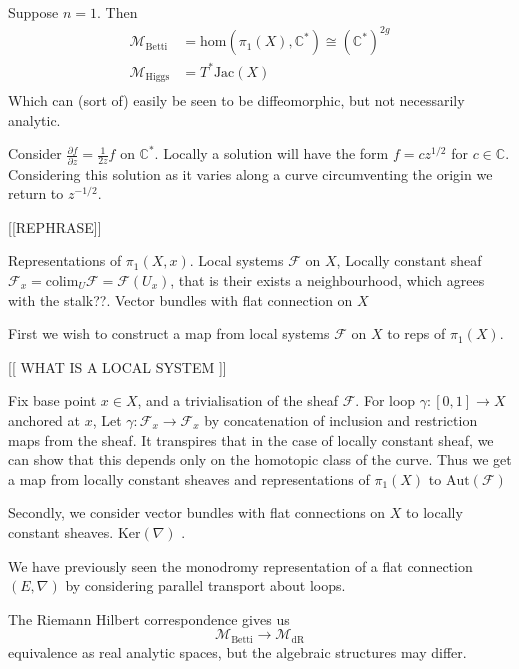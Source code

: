 Suppose $n=1$. 
Then 
\begin{align}
    \mathcal{M}_{\mathrm{Betti}} & = \mathrm{hom} ( \pi_1 (X) , \mathbb{C} ^* ) \cong (\mathbb{C} ^*)^{2g} \\
    \mathcal{M}_{\mathrm{Higgs}} & = T^* \mathrm{Jac} ( X) \\
\end{align}
Which can (sort of) easily be seen to be diffeomorphic, but not necessarily analytic. 

Consider $ \frac{\partial f }{ \partial z } = \frac{1}{2z} f $ on $ \mathbb{C} ^* $.
Locally a solution will have the form $ f = c z^{1/2} $ for $c \in \mathbb{C} $. 
Considering this solution as it varies along a curve circumventing the origin we return to $z ^{-1/2} $.

[[REPHRASE]] 

Representations of $\pi_1 (X,x) $. 
Local systems $\mathcal{F} $ on $X$,
Locally constant sheaf $ \mathcal{F}_x  = \mathrm{colim} _{U} \mathcal{F} = \mathcal{F}(U_x) $, 
that is their exists a neighbourhood, which agrees with the stalk??.
Vector bundles with flat connection on $X$ 

First we wish to construct a map from local systems $\mathcal{F}$ on $X $ to reps of $\pi_1(X)$. 

[[ WHAT IS A LOCAL SYSTEM ]] 

Fix base point $x \in X$, and a trivialisation of the sheaf $\mathcal{F}$. 
For loop $ \gamma: [0,1] \rightarrow  X$ anchored at $x$, 
Let $ \gamma: \mathcal{F}_x \rightarrow  \mathcal{F}_x $ by concatenation of inclusion and restriction maps from the sheaf.  
It transpires that in the case of locally constant sheaf, we can show that this depends only on the homotopic class of the curve. 
Thus we get a map from locally constant sheaves and representations of $\pi_1(X) $ to $\mathrm{Aut}(\mathcal{F} ) $ 

Secondly, we consider vector bundles with flat connections on $X$ to locally constant sheaves. 
$ \mathrm{Ker}(\nabla) $ .

We have previously seen the monodromy representation of a flat connection $( E, \nabla ) $ 
by considering parallel transport about loops.

The Riemann Hilbert correspondence gives us
\begin{equation}
    \mathcal{M} _{\mbox{Betti}} \rightarrow \mathcal{M} _{\mbox{dR}} 
\end{equation}
equivalence as real analytic spaces, but the algebraic structures may differ. 









 

